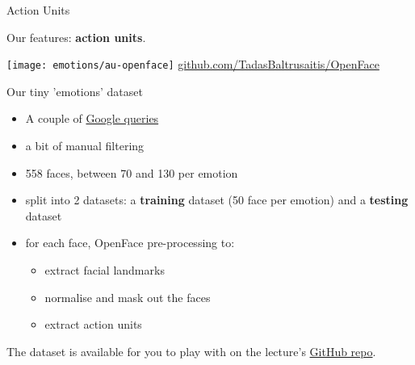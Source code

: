 \documentclass[compress,xcolor=table]{beamer}
\begin{document}


\begin{frame}{Action Units}
    \begin{center}
        Our features: \textbf{action units}.

        \texttt{[image: emotions/au-openface]}
        \vspace{2em}
        \href{https://github.com/TadasBaltrusaitis/OpenFace}{github.com/TadasBaltrusaitis/OpenFace}

    \end{center}
\end{frame}





\begin{frame}{Our tiny 'emotions' dataset}
    \begin{itemize}
        \item A couple of \href{https://www.google.co.uk/search?q=human+face+happiness&tbm=isch&source=lnt&tbs=itp:face}{Google queries}
        \item a bit of manual filtering
        \item 558 faces, between 70 and 130 per emotion
        \item split into 2 datasets: a {\bf training} dataset (50 face per
            emotion) and a {\bf testing} dataset
        \item for each face, OpenFace pre-processing to:
            \begin{itemize}
                \item extract facial landmarks
                \item normalise and mask out the faces
                \item extract action units
            \end{itemize}
    \end{itemize}

    The dataset is available for you to play with on the lecture's
    \href{https://github.com/severin-lemaignan/lecture-hri-emotions}{GitHub repo}.
\end{frame}
\end{document}
